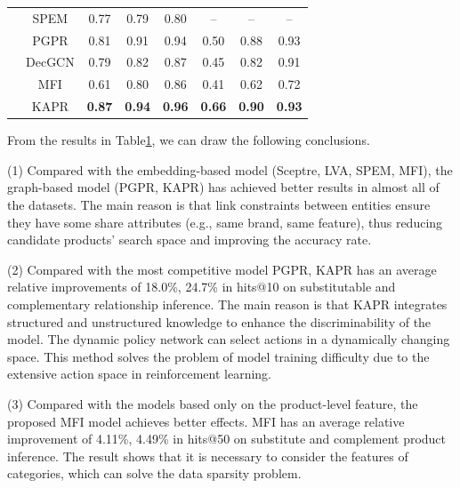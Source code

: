 \documentclass[review]{elsarticle}
\begin{document}
\begin{sloppypar}
\begin{table}[]
\begin{tabular}{c|c|ccc|ccc}
                             & SPEM     & 0.77           & 0.79           & 0.80           & --             & --              & --             \\
                             & PGPR     & 0.81           & 0.91           & 0.94           & 0.50        & 0.88          & 0.93          \\
                             & DecGCN   & 0.79           &  0.82          &  0.87          &  0.45        &  0.82          &   0.91         \\
                             & MFI      & 0.61           & 0.80           & 0.86           & 0.41          & 0.62           & 0.72           \\
                             & KAPR     & \textbf{0.87} & \textbf{0.94} & \textbf{0.96} & \textbf{0.66} & \textbf{0.90}  & \textbf{0.93}  \\ \hline
\end{tabular}
\label{Table 2}
\end{table}
 
From the results in Table\ref{Table 2}, we can draw the following conclusions.

(1) Compared with the embedding-based model (Sceptre, LVA, SPEM, MFI), the graph-based model (PGPR, KAPR) has achieved better results in almost all of the datasets. The main reason is that link constraints between entities ensure they have some share attributes (e.g., same brand, same feature), thus reducing candidate products' search space and improving the accuracy rate.

(2) Compared with the most competitive model PGPR, KAPR has an average relative improvements of 18.0\%, 24.7\% in hits@10 on substitutable and complementary relationship inference. The main reason is that KAPR integrates structured and unstructured knowledge to enhance the discriminability of the model. The dynamic policy network can select actions in a dynamically changing space. This method solves the problem of model training difficulty due to the extensive action space in reinforcement learning.

(3) Compared with the models based only on the product-level feature, the proposed MFI model achieves better effects. MFI has an average relative improvement of 4.11\%, 4.49\% in hits@50 on substitute and complement product inference. The result shows that it is necessary to consider the features of categories, which can solve the data sparsity problem.


\end{sloppypar}
\end{document}
